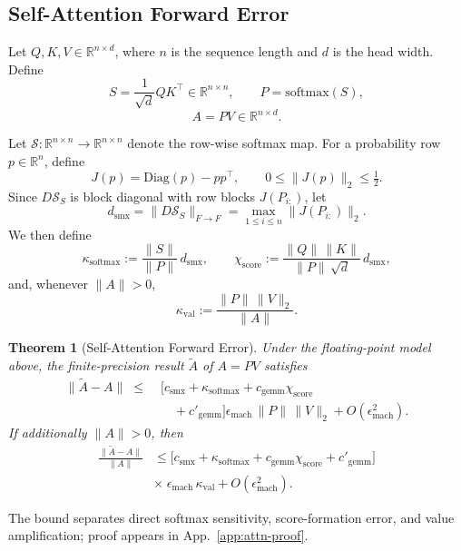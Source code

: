 \documentclass[twoside]{article}
\newtheorem{theorem}{Theorem}
\theoremstyle{definition}
\theoremstyle{remark}
\begin{document}
\subsection{Self-Attention Forward Error}
\label{subsec:attn}

Let $Q,K,V \in \mathbb{R}^{n \times d}$, where $n$ is the sequence length and $d$ is the head width.
Define
\[
S = \frac{1}{\sqrt d} QK^\top \in \mathbb{R}^{n\times n},
\qquad
P = \mathrm{softmax}(S),
\]
\[
A = PV \in \mathbb{R}^{n\times d}.
\]

Let $\mathcal{S}:\mathbb{R}^{n\times n}\to\mathbb{R}^{n\times n}$ denote the
row-wise softmax map. For a probability row $p \in \mathbb{R}^n$, define
\[
J(p) = \mathrm{Diag}(p) - pp^\top,
\qquad
0 \le \|J(p)\|_2 \le \tfrac12.
\]
Since $D\mathcal{S}_S$ is block diagonal with row blocks $J(P_{i:})$, let
\[
d_{\mathrm{smx}}
=
\|D\mathcal{S}_S\|_{F\to F}
=
\max_{1 \le i \le n}\|J(P_{i:})\|_2.
\]
We then define
\[
\kappa_{\mathrm{softmax}}
:=
\frac{\|S\|}{\|P\|}\,d_{\mathrm{smx}},
\qquad
\chi_{\mathrm{score}}
:=
\frac{\|Q\|\,\|K\|}{\|P\|\,\sqrt d}\,d_{\mathrm{smx}},
\]
and, whenever $\|A\|>0$,
\[
\kappa_{\mathrm{val}}
:=
\frac{\|P\|\,\|V\|_2}{\|A\|}.
\]

\begin{theorem}[Self-Attention Forward Error]
\label{thm:attn}
Under the floating-point model above, the finite-precision result
$\widetilde{A}$ of $A = PV$ satisfies
\begin{equation}
\label{eq:attn-bound}
\begin{split}
\|\widetilde{A}-A\|
\;\le\;&
\Big[
c_{\mathrm{smx}}
+
\kappa_{\mathrm{softmax}}
+ c_{\mathrm{gemm}}\chi_{\mathrm{score}}
\\
&\quad
+
c'_{\mathrm{gemm}}
\Big]
\epsilon_{\mathrm{mach}}\,\|P\|\,\|V\|_2
+
O(\epsilon_{\mathrm{mach}}^2).
\end{split}
\end{equation}
If additionally $\|A\|>0$, then
\[
\begin{aligned}
\frac{\|\widetilde{A}-A\|}{\|A\|}
&\le
\Big[
c_{\mathrm{smx}}
+
\kappa_{\mathrm{softmax}}
+
c_{\mathrm{gemm}}\chi_{\mathrm{score}}
+
c'_{\mathrm{gemm}}
\Big]
\\
&\times\;\epsilon_{\mathrm{mach}}\,\kappa_{\mathrm{val}}
+
O(\epsilon_{\mathrm{mach}}^2).
\end{aligned}
\]
\end{theorem}

The bound separates direct softmax sensitivity, score-formation error, and
value amplification; proof appears in App.~\ref{app:attn-proof}.
\end{document}
